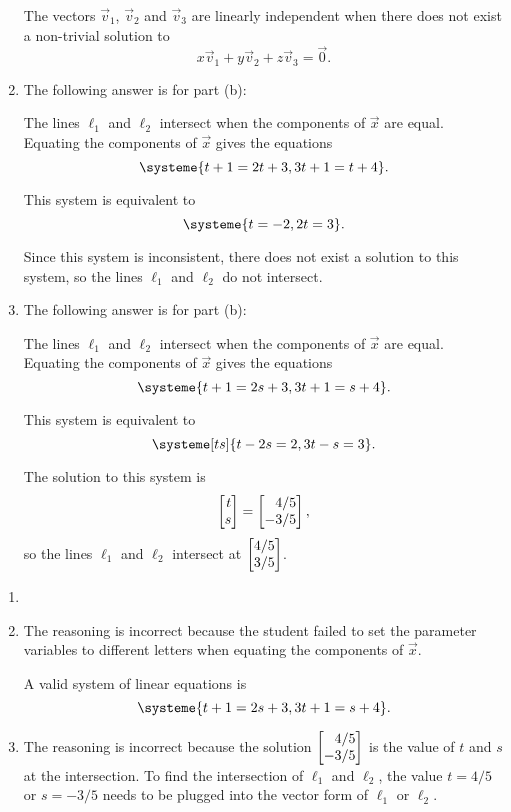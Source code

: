 \begin{exercises}
\begin{problist}
\begin{enumerate}
			The vectors $\vec v_1$, $\vec v_2$ and $\vec v_3$ are linearly independent when there does not exist a non-trivial solution to
			\[
				x\vec v_1+y\vec v_2+z\vec v_3=\vec 0.
			\]
			\item 
			The following answer is for part (b):
			
			The lines $\ell_1$ and $\ell_2$ intersect when the components of $\vec x$ are equal. Equating the components of $\vec x$ gives the equations
			\[
				\systeme{t+1=2t+3,3t+1=t+4}.
			\]
			
			This system is equivalent to
			\[
				\systeme{t=-2,2t=3}.
			\]
			
			Since this system is inconsistent, there does not exist a solution to this system, so the lines $\ell_1$ and $\ell_2$ do not intersect.
			\item 
			The following answer is for part (b):
			
			The lines $\ell_1$ and $\ell_2$ intersect when the components of $\vec x$ are equal. Equating the components of $\vec x$ gives the equations
			\[
				\systeme{t+1=2s+3,3t+1=s+4}.
			\]
			
			This system is equivalent to
			\[
				\systeme[ts]{t-2s=2,3t-s=3}.
			\]
			
			The solution to this system is
			\[
				\mat{t\\s}=\mat{4/5\\-3/5},
			\]
			so the lines $\ell_1$ and $\ell_2$ intersect at $\mat{4/5\\3/5}$.
		\end{enumerate}
		\begin{solution}
			\begin{enumerate}
				\item 
				\item The reasoning is incorrect because the student failed to set the parameter variables to different letters when equating the components of $\vec x$.
				
				A valid system of linear equations is
				\[
					\systeme{t+1=2s+3,3t+1=s+4}.
				\]
				\item The reasoning is incorrect because the solution $\mat{4/5\\-3/5}$ is the value of $t$ and $s$ at the intersection. To find the intersection of $\ell_1$ and $\ell_2$, the value $t=4/5$ or $s=-3/5$ needs to be plugged into the vector form of $\ell_1$ or $\ell_2$.
			\end{enumerate}
		\end{solution}
	\end{problist}
\end{exercises}

